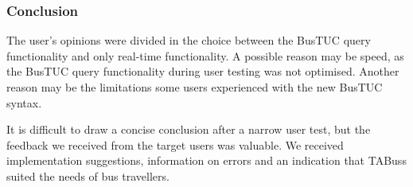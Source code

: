 \subsubsection{Conclusion}
The user's opinions were divided in the choice between the BusTUC query functionality and only real-time functionality. A possible reason may be speed, as the BusTUC query functionality during user testing was not optimised. Another reason may be the limitations some users experienced with the new BusTUC syntax. 

It is difficult to draw a concise conclusion after a narrow user test, but the feedback we received from the target users was valuable. We received implementation suggestions, information on errors and an indication that TABuss suited the needs of bus travellers. 







